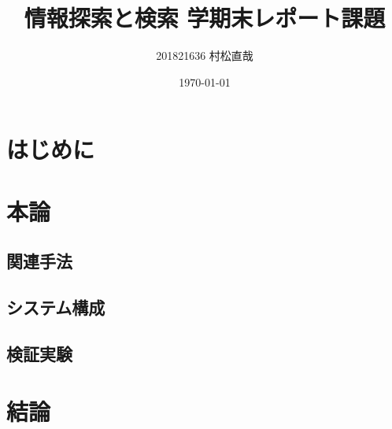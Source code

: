 \documentclass[uplatex,a4paper]{jsarticle}
\title{情報探索と検索 学期末レポート課題}
\author{201821636 村松直哉}
\date{\today}
\begin{document}
\maketitle
%
%
\section{はじめに}


\section{本論}

\subsection{関連手法}

\subsection{システム構成}

\subsection{検証実験}



\section{結論}




\end{document}
